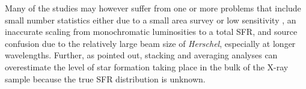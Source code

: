 \documentclass[fleqn, usenatbib]{mnras}
\newcommand{\herschel}{\emph{Herschel}}
\begin{document}

Many of the studies may however suffer from one or more problems that include small number statistics either due to a small area survey or low sensitivity \cite[e.g.][]{Harrion:2012lj}, an inaccurate scaling from monochromatic luminosities to a total SFR, and source confusion due to the relatively large beam size of \herschel, especially at longer wavelengths. Further, as \citet{Barger:2015ly} pointed out, stacking and averaging analyses can overestimate the level of star formation taking place in the bulk of the X-ray sample because the true SFR distribution is unknown. 


\end{document}
